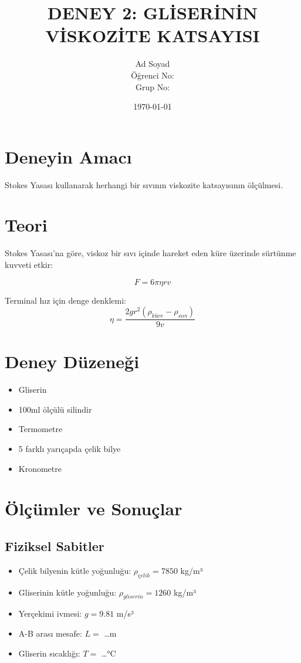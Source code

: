 \documentclass[12pt,a4paper]{article}
\title{DENEY 2: GLİSERİNİN VİSKOZİTE KATSAYISI}
\author{Ad Soyad \\ Öğrenci No: \\ Grup No: }
\date{\today}
\begin{document}
\maketitle

\section{Deneyin Amacı}
Stokes Yasası kullanarak herhangi bir sıvının viskozite katsayısının ölçülmesi.

\section{Teori}
Stokes Yasası'na göre, viskoz bir sıvı içinde hareket eden küre üzerinde sürtünme kuvveti etkir:

\begin{equation}
F = 6\pi\eta rv
\end{equation}

Terminal hız için denge denklemi:
\begin{equation}
\eta = \frac{2gr^2(\rho_{küre} - \rho_{sıvı})}{9v}
\end{equation}

\section{Deney Düzeneği}
\begin{itemize}
    \item Gliserin
    \item 100ml ölçülü silindir
    \item Termometre
    \item 5 farklı yarıçapda çelik bilye
    \item Kronometre
\end{itemize}

\section{Ölçümler ve Sonuçlar}

\subsection{Fiziksel Sabitler}
\begin{itemize}
    \item Çelik bilyenin kütle yoğunluğu: $\rho_{çelik} = 7850$ kg/m³
    \item Gliserinin kütle yoğunluğu: $\rho_{gliserin} = 1260$ kg/m³
    \item Yerçekimi ivmesi: $g = 9.81$ m/s²
    \item A-B arası mesafe: $L = $ \ldots m
    \item Gliserin sıcaklığı: $T = $ \ldots °C
\end{itemize}
\end{document}

